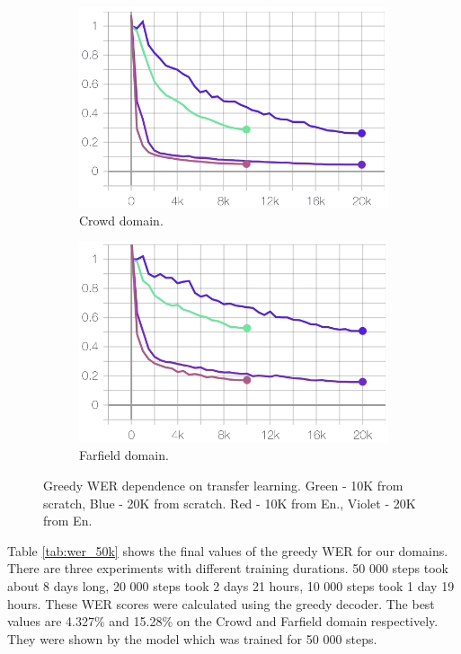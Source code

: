 \documentclass[a4paper]{article}
\begin{document}
\begin{figure}[ht]
\begin{subfigure}{.49\linewidth}
  \centering
  \includegraphics[width=1.\linewidth]{LaTeX/img/crowd10k20k.png}  
  \caption{Crowd domain.}
  \label{fig:crowd_domain}
\end{subfigure}
\begin{subfigure}{.49\linewidth}
  \centering
  \includegraphics[width=1.\linewidth]{LaTeX/img/portal10k20k.png}  
  \caption{Farfield domain.}
  \label{fig:portal_domain}
\end{subfigure}
\caption{Greedy WER dependence on transfer learning. Green - 10K from scratch, Blue - 20K from scratch. Red - 10K from En., Violet - 20K from En.}
\label{fig:portal_crowd_domain}
\end{figure}

Table \ref{tab:wer_50k} shows the final values of the greedy WER for our domains. There are three experiments with different training durations. 50 000 steps took about 8 days long, 20 000 steps took 2 days 21 hours, 10 000 steps took 1 day 19 hours. These WER scores were calculated using the greedy decoder. The best values are 4.327\% and 15.28\% on the Crowd and Farfield domain respectively. They were shown by the model which was trained for 50 000 steps.  
\end{document}

